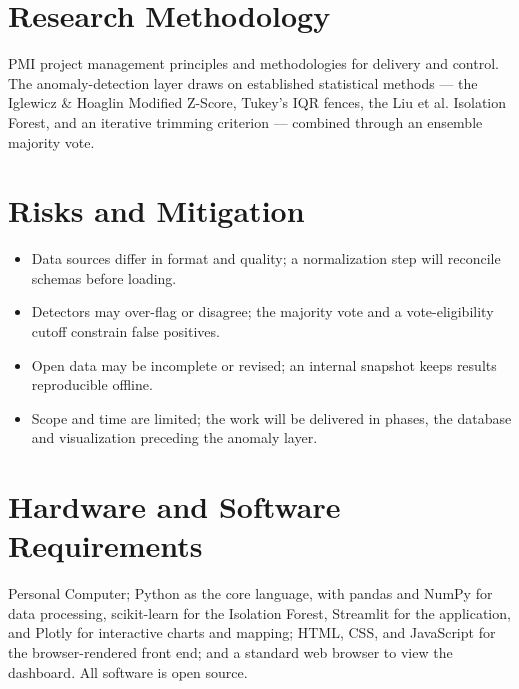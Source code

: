 \documentclass[10pt]{article}
\newcommand{\heading}[1]{\section*{#1}}
\begin{document}
\heading{Research Methodology}
PMI project management principles and methodologies for delivery and control. The anomaly-detection layer draws on established statistical methods --- the Iglewicz \& Hoaglin Modified Z-Score, Tukey's IQR fences, the Liu et al. Isolation Forest, and an iterative trimming criterion --- combined through an ensemble majority vote.

\heading{Risks and Mitigation}
\begin{itemize}
  \item Data sources differ in format and quality; a normalization step will reconcile schemas before loading.
  \item Detectors may over-flag or disagree; the majority vote and a vote-eligibility cutoff constrain false positives.
  \item Open data may be incomplete or revised; an internal snapshot keeps results reproducible offline.
  \item Scope and time are limited; the work will be delivered in phases, the database and visualization preceding the anomaly layer.
\end{itemize}

\heading{Hardware and Software Requirements}
Personal Computer; Python as the core language, with pandas and NumPy for data processing, scikit-learn for the Isolation Forest, Streamlit for the application, and Plotly for interactive charts and mapping; HTML, CSS, and JavaScript for the browser-rendered front end; and a standard web browser to view the dashboard. All software is open source.
\end{document}
